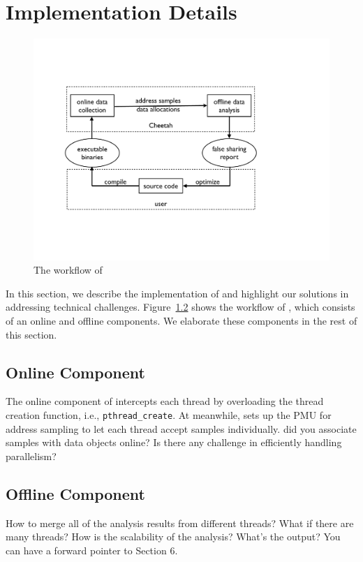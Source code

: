 \section{Implementation Details}
\label{sec:implement}

\begin{figure}[htbp]
\centering
\label{fig:fsinfs}
\includegraphics[width=\columnwidth]{figure/workflow}
\caption{The workflow of \cheetah{}}
\end{figure}

In this section, we describe the implementation of \cheetah{} and highlight our solutions in addressing technical challenges. Figure~\ref{} shows the workflow of \cheetah{}, 
which consists of an online and offline components. We elaborate these components in the rest of this section.

\subsection{Online Component}
The online component of \cheetah{} intercepts each thread by overloading the thread creation function, i.e., {\tt pthread\_create}. At meanwhile, \cheetah{} sets up the PMU for address sampling to let each thread accept samples individually. {\color{red} did you associate samples with data objects online? Is there any challenge in efficiently handling parallelism?}



\subsection{Offline Component}
{\color{red} How to merge all of the analysis results from different threads? What if there are many threads? How is the scalability of the analysis? What's the output? You can have a forward pointer to Section 6.}

